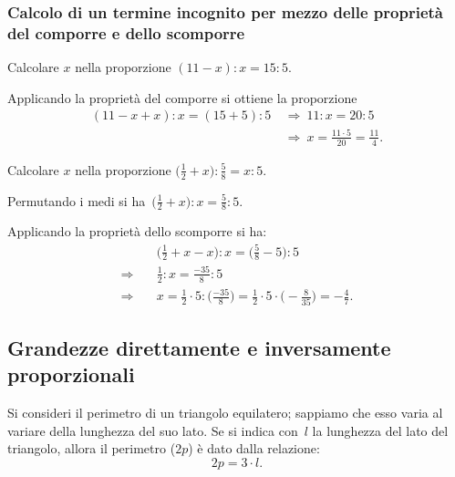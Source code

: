 \subsubsection*{Calcolo di un termine incognito per mezzo delle proprietà del comporre e dello scomporre}

\begin{exrig}
  \begin{esempio}
    Calcolare $x$ nella proporzione $(11-x):x=15:5$.

  Applicando la proprietà del comporre si ottiene la proporzione
  \begin{align*}
  (11-x+x):x=(15+5):5 &\:\Rightarrow\: 11:x=20:5\\
  &\:\Rightarrow\: x=\frac{11\cdot5}{20}=\frac{11}{4}.
  \end{align*}
  \end{esempio}

\begin{esempio}
 Calcolare $x$ nella proporzione $\displaystyle{\bigg(\frac{1}{2}+x\bigg):\frac{5}{8}=x:5}$.

 Permutando i medi si ha~$\displaystyle{\bigg(\frac{1}{2}+x\bigg):x=\frac{5}{8}:5}$.

 Applicando la proprietà dello scomporre si ha:
\begin{align*}
  &\bigg(\frac{1}{2}+x-x\bigg):x=\bigg(\frac{5}{8}-5\bigg):5\\
\Rightarrow\quad &\frac{1}{2}:x=\frac{-35}{8}:5\\
\Rightarrow\quad &x=\frac{1}{2}\cdot5:\bigg(\frac{-35}{8}\bigg)=\frac{1}{2}\cdot5%
\cdot\bigg(-\frac{8}{35}\bigg)=-\frac{4}{7}.
\end{align*}
\end{esempio}
\end{exrig}

\vspazio\ovalbox{\risolvii \ref{ese:3.118}, \ref{ese:3.119}, \ref{ese:3.120}, \ref{ese:3.121}, \ref{ese:3.122}, \ref{ese:3.123},
\ref{ese:3.124}, \ref{ese:3.125}, \ref{ese:3.126}}

\subsection{Grandezze direttamente e inversamente proporzionali}

Si consideri il perimetro di un triangolo equilatero;
sappiamo che esso varia al variare della lunghezza del suo lato.
Se si indica con~$l$ la lunghezza del lato del triangolo, allora il perimetro ($2p$) è dato dalla relazione:
\[2p=3\cdot l.\]

